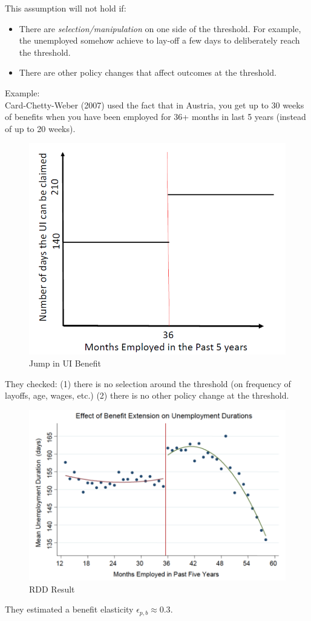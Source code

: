         This assumption will not hold if:
        \begin{itemize}
            \item There are \emph{selection/manipulation} on one side of the threshold. For example, the unemployed somehow achieve to lay-off a few days to deliberately reach the threshold.
            \item There are other policy changes that affect outcomes at the threshold.
        \end{itemize}
        Example:\\
        Card-Chetty-Weber (2007) used the fact that in Austria, you get up to 30 weeks of benefits when you have been employed for 36+ months in last 5 years (instead of up to 20 weeks).
        \begin{figure}[H]
            \centering
            \includegraphics[width=3 in]{images/ch1/card_1.png}
            \caption{Jump in UI Benefit}
            \label{fig:card_1}
        \end{figure}
        They checked: (1) there is no selection around the threshold (on frequency of layoffs, age, wages, etc.) (2) there is no other policy change at the threshold.
        \begin{figure}[H]
            \centering
            \includegraphics[width=4 in]{images/ch1/card_2.png}
            \caption{RDD Result}
            \label{fig:card_2}
        \end{figure}
        They estimated a benefit elasticity $\epsilon_{p,b} \approx 0.3$.
        
